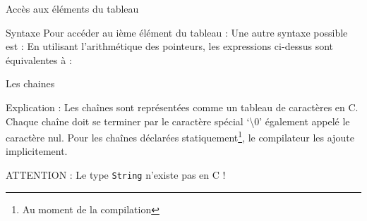   	\begin{frame}{Accès aux éléments du tableau}
  		\begin{block}{Syntaxe}
  			Pour accéder au ième élément du tableau :
  			\arrayIndexAccess
  			Une autre syntaxe possible est :
  			\arrayIndexAccessTwo
  			En utilisant l'arithmétique des pointeurs, les expressions ci-dessus sont équivalentes à :
  			\arrayIndexAccessThree
  		\end{block}
  	\end{frame}
	
  	\begin{frame}{Les chaines}
  		\begin{block}{Explication :}
  			Les chaînes sont représentées comme un tableau de caractères en C. Chaque chaîne doit se terminer par le caractère spécial \alert{`\textbackslash0'} également appelé le caractère nul. Pour les chaînes déclarées statiquement\footnote[frame]{Au moment de la compilation}, le compilateur les ajoute implicitement.
  		\end{block}
  		\begin{alertblock}{ATTENTION :}
  			Le type \texttt{String} \alert{n'existe pas} en C !
  		\end{alertblock}
  	\end{frame}
  

